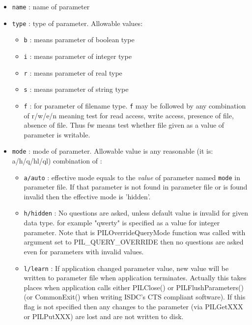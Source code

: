 \begin{itemize}

\item
{\tt name} : name of parameter 

\item
{\tt type} : type of parameter. Allowable values: 

\begin{itemize}
\item
{\tt b} : means parameter of boolean type

\item
{\tt i} : means parameter of integer type

\item
{\tt r} : means parameter of real type

\item
{\tt s} : means parameter of string type

\item
{\tt f} : for parameter of filename type. {\tt f} may be followed
by any combination of r/w/e/n meaning test for read access, write
access, presence of file, absence of file. Thus fw means test whether
file given as a value of parameter is writable. 
\end{itemize}

\item
{\tt mode} : mode of parameter. Allowable value is any reasonable
(it is: a/h/q/hl/ql) combination of : 

\begin{itemize}
\item
{\tt a/auto} : effective mode equals to the {\it value} of parameter named
{\tt mode} in parameter file. If that parameter is not found in parameter
file or is found invalid then the effective mode is 'hidden'. 

\item
{\tt h/hidden} : No questions are asked, unless default value is invalid
for given data type. for example "qwerty" is specified as a value
for integer parameter. Note that is PILOverrideQueryMode function
was called with argument set to PIL\_QUERY\_OVERRIDE then no questions
are asked even for parameters with invalid values.

\item
{\tt l/learn} : If application changed parameter value, new value will be
written to parameter file when application terminates.
Actually this takes places when application calls either PILClose()
or PILFlushParameters() (or CommonExit() when writing ISDC's CTS
compliant software).
If this flag is not specified then any changes to the parameter 
(via PILGetXXX or PILPutXXX) are lost and are not written to disk.


\end{itemize}
\end{itemize}
